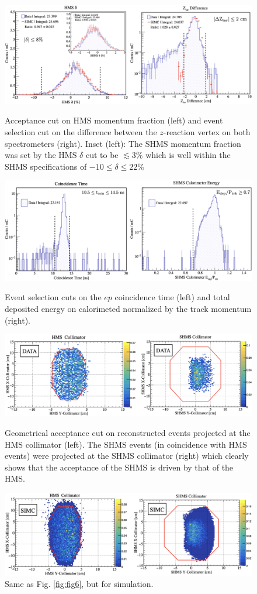 \documentclass[aps, prl]{revtex4-2}  %
\begin{document}
\begin{figure}
\includegraphics[scale=0.30]{plots/deltaAcc_and_ZtarCUT_80MeV_35deg.png}
\caption{Acceptance cut on HMS momentum fraction (left) and event selection cut on the difference between the $z$-reaction vertex on both spectrometers (right).
  Inset (left): The SHMS momentum fraction was set by the HMS $\delta$ cut to be $\lesssim$3$\%$ which is well within the SHMS specifications of  $-10 \leq \delta \leq22 \%$}
\label{fig:fig4}
\includegraphics[scale=0.30]{plots/coin_and_eCal_CUT_80MeV_35deg.png}
\caption{Event selection cuts on the $ep$ coincidence time (left) and total deposited energy on calorimeted normalized by the track momentum (right).}
\label{fig:fig5}
\includegraphics[scale=0.30]{plots/collimator_CUT_80MeV_35deg_data.png}
\caption{Geometrical acceptance cut on reconstructed events projected at the HMS collimator (left). The SHMS events (in coincidence with HMS events) were projected at the SHMS collimator (right)
  which clearly shows that the acceptance of the SHMS is driven by that of the HMS.}
\label{fig:fig6}
\includegraphics[scale=0.30]{plots/collimator_CUT_80MeV_35deg_SIMC.png}
\caption{Same as Fig. \ref{fig:fig6}, but for simulation.}
\label{fig:fig7}
\end{figure}
\clearpage
\end{document}
